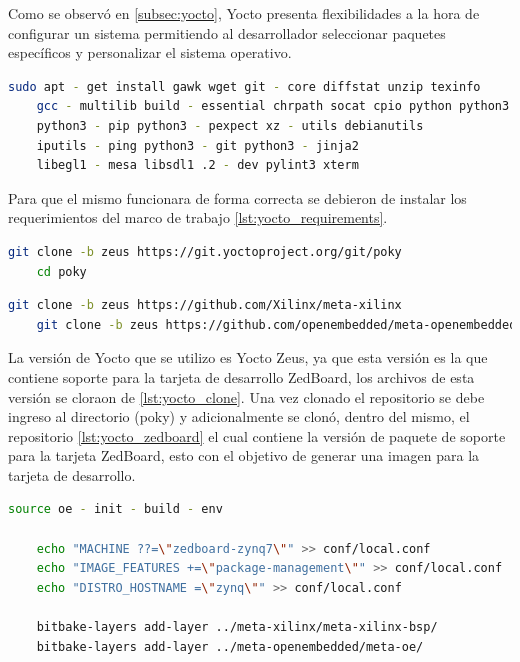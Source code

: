Como se observó en \ref{subsec:yocto}, Yocto presenta flexibilidades a la hora de configurar un sistema permitiendo al desarrollador seleccionar paquetes específicos y personalizar el sistema operativo.

\begin{lstlisting}[language=bash, caption={Requerimientos Yocto Zeus, Linux}, label=lst:yocto_requirements]
    sudo apt - get install gawk wget git - core diffstat unzip texinfo
    gcc - multilib build - essential chrpath socat cpio python python3
    python3 - pip python3 - pexpect xz - utils debianutils 
    iputils - ping python3 - git python3 - jinja2 
    libegl1 - mesa libsdl1 .2 - dev pylint3 xterm
\end{lstlisting}

Para que el mismo funcionara de forma correcta se debieron de instalar los requerimientos del marco de trabajo \ref{lst:yocto_requirements}.

\begin{lstlisting}[language=bash, caption={Version de Yocto}, label=lst:yocto_clone]
    git clone -b zeus https://git.yoctoproject.org/git/poky
    cd poky
\end{lstlisting}

\begin{lstlisting}[language=bash, caption={BSP para Zedboard}, label=lst:yocto_zedboard]
    git clone -b zeus https://github.com/Xilinx/meta-xilinx
    git clone -b zeus https://github.com/openembedded/meta-openembedded.git
\end{lstlisting}

La versión de Yocto que se utilizo es Yocto Zeus, ya que esta versión es la que contiene soporte para la tarjeta de desarrollo ZedBoard, los archivos de esta versión se cloraon de \ref{lst:yocto_clone}. Una vez clonado el repositorio se debe ingreso al directorio (poky) y adicionalmente se clonó, dentro del mismo, el repositorio \ref{lst:yocto_zedboard} el cual contiene la versión de paquete de soporte para la tarjeta ZedBoard, esto con el objetivo de generar una imagen para la tarjeta de desarrollo.

\begin{lstlisting}[language=bash, caption={Configuraciones adicionales, Yocto}, label=lst:aditional_config]
    source oe - init - build - env
    
    echo "MACHINE ??=\"zedboard-zynq7\"" >> conf/local.conf
    echo "IMAGE_FEATURES +=\"package-management\"" >> conf/local.conf
    echo "DISTRO_HOSTNAME =\"zynq\"" >> conf/local.conf
    
    bitbake-layers add-layer ../meta-xilinx/meta-xilinx-bsp/
    bitbake-layers add-layer ../meta-openembedded/meta-oe/
\end{lstlisting}

